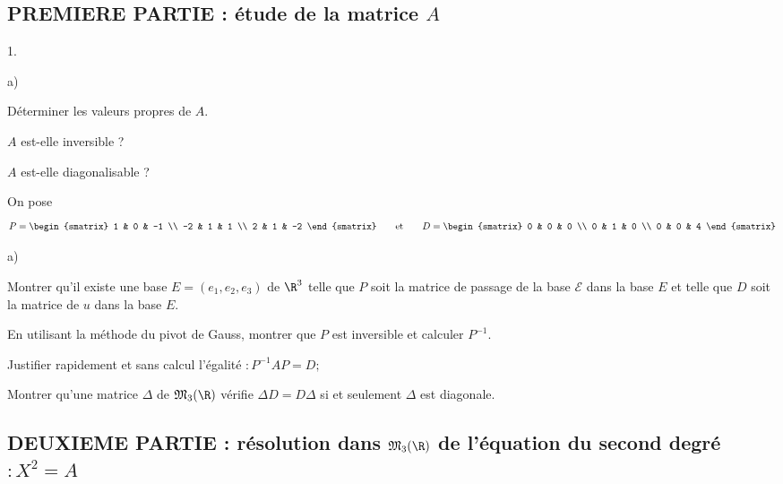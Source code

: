 \documentclass[11pt]{article}%
\begin{document}
\subsection*{PREMIERE PARTIE : étude de la matrice $A$}

\begin{noliste}{1.}
 \setlength{\itemsep}{4mm}
\item 

\begin{noliste}{a)}
 \setlength{\itemsep}{2mm}
\item Déterminer les valeurs propres de $A.$

\item $A$ est-elle inversible ?

\item $A$ est-elle diagonalisable ?
\end{noliste}

\item On pose 
\[
P = 
\begin{smatrix}
1 & 0 & -1 \\
-2 & 1 & 1 \\
2 & 1 & -2
\end{smatrix}
\qquad \text{et}\qquad D = 
\begin{smatrix}
0 & 0 & 0 \\
0 & 1 & 0 \\
0 & 0 & 4
\end{smatrix}
\]

\begin{noliste}{a)}
 \setlength{\itemsep}{2mm}
\item Montrer qu'il existe une base $E = (e_{1},e_{2},e_{3})$ de
$\R^{3}$ telle que $P$ soit la matrice de passage de la base
$\mathcal{E}$ dans
la base $E$ et telle que $D$ soit la matrice de $u$ dans la base $E.$

\item En utilisant la méthode du pivot de Gauss, montrer que $P$ est
inversible et calculer $P^{-1}.$

\item Justifier rapidement et sans calcul l'égalité $ :P^{-1}AP = D;$

\item Montrer qu'une matrice $\Delta $ de $\mathfrak{M}_{3}(\R)$
vérifie $\Delta D = D\Delta $ si et seulement $\Delta $ est diagonale.
\end{noliste}
\end{noliste}

\subsection*{DEUXIEME PARTIE : résolution dans $\mathfrak{M}_{3}(\R)$
de l'équation du second degré $ :X^{2} = A$}
\end{document}
